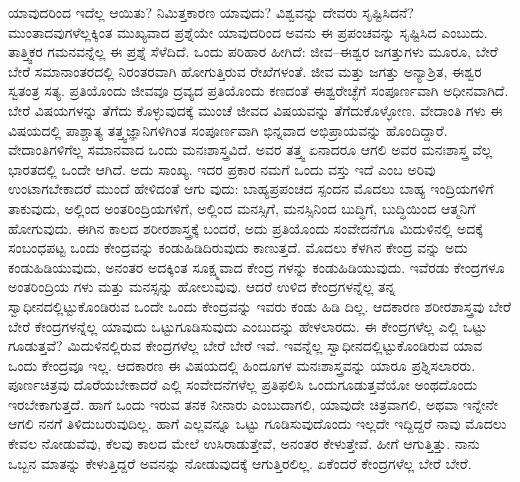 ಯಾವುದರಿಂದ ಇದೆಲ್ಲ ಆಯಿತು? ನಿಮಿತ್ತಕಾರಣ ಯಾವುದು? ವಿಶ್ವವನ್ನು ದೇವರು ಸೃಷ್ಟಿಸಿದನೆ? ಮುಂತಾದವುಗಳೆಲ್ಲಕ್ಕಿಂತ ಮುಖ್ಯವಾದ ಪ್ರಶ್ನೆಯೇ ಯಾವುದರಿಂದ ಅವನು ಈ ಪ್ರಪಂಚವನ್ನು ಸೃಷ್ಟಿಸಿದ ಎಂಬುದು. ತಾತ್ತ್ವಿಕರ ಗಮನವನ್ನೆಲ್ಲ ಈ ಪ್ರಶ್ನೆ ಸೆಳೆದಿದೆ. ಒಂದು ಪರಿಹಾರ ಹೀಗಿದೆ: ಜೀವ–ಈಶ್ವರ ಜಗತ್ತುಗಳು ಮೂರೂ, ಬೇರೆ ಬೇರೆ ಸಮಾನಾಂತರದಲ್ಲಿ ನಿರಂತರವಾಗಿ ಹೋಗುತ್ತಿರುವ ರೇಖೆಗಳಂತೆ. ಜೀವ ಮತ್ತು ಜಗತ್ತು ಅನ್ಯಾಶ್ರಿತ, ಈಶ್ವರ ಸ್ವತಂತ್ರ ಸತ್ಯ. ಪ್ರತಿಯೊಂದು ಜೀವವೂ ದ್ರವ್ಯದ ಪ್ರತಿಯೊಂದು ಕಣದಂತೆ ಈಶ್ವರೇಚ್ಛೆಗೆ ಸಂಪೂರ್ಣವಾಗಿ ಅಧೀನವಾಗಿದೆ. ಬೇರೆ ವಿಷಯಗಳನ್ನು ತೆಗೆದು ಕೊಳ್ಳುವುದಕ್ಕೆ ಮುಂಚೆ ಜೀವದ ವಿಷಯವನ್ನು ತೆಗೆದುಕೊಳ್ಳೋಣ. ವೇದಾಂತಿ ಗಳು ಈ ವಿಷಯದಲ್ಲಿ ಪಾಶ್ಚಾತ್ಯ ತತ್ತ್ವಜ್ಞಾನಿಗಳಿಗಿಂತ ಸಂಪೂರ್ಣವಾಗಿ ಭಿನ್ನವಾದ ಅಭಿಪ್ರಾಯವನ್ನು ಹೊಂದಿದ್ದಾರೆ. ವೇದಾಂತಿಗಳಿಗೆಲ್ಲ ಸಮಾನವಾದ ಒಂದು ಮನಃಶಾಸ್ತ್ರವಿದೆ. ಅವರ ತತ್ತ್ವ ಏನಾದರೂ ಆಗಲಿ ಅವರ ಮನಃಶಾಸ್ತ್ರ ವೆಲ್ಲ ಭಾರತದಲ್ಲಿ ಒಂದೇ ಆಗಿದೆ. ಅದು ಸಾಂಖ್ಯ. ಇದರ ಪ್ರಕಾರ ನಮಗೆ ಒಂದು ವಸ್ತು ಇದೆ ಎಂಬ ಅರಿವು ಉಂಟಾಗಬೇಕಾದರೆ ಮುಂದೆ ಹೇಳಿದಂತೆ ಆಗು ವುದು: ಬಾಹ್ಯಪ್ರಪಂಚದ ಸ್ಪಂದನ ಮೊದಲು ಬಾಹ್ಯ ಇಂದ್ರಿಯಗಳಿಗೆ ತಾಕುವುದು, ಅಲ್ಲಿಂದ ಅಂತರಿಂದ್ರಿಯಗಳಿಗೆ, ಅಲ್ಲಿಂದ ಮನಸ್ಸಿಗೆ, ಮನಸ್ಸಿನಿಂದ ಬುದ್ಧಿಗೆ, ಬುದ್ಧಿಯಿಂದ ಆತ್ಮನಿಗೆ ಹೋಗುವುದು. ಈಗಿನ ಕಾಲದ ಶರೀರಶಾಸ್ತ್ರಕ್ಕೆ ಬಂದರೆ, ಅದು ಪ್ರತಿಯೊಂದು ಸಂವೇದನೆಗೂ ಮಿದುಳಿನಲ್ಲಿ ಅದಕ್ಕೆ ಸಂಬಂಧಪಟ್ಟ ಒಂದು ಕೇಂದ್ರವನ್ನು ಕಂಡುಹಿಡಿದಿರುವುದು ಕಾಣುತ್ತದೆ. ಮೊದಲು ಕೆಳಗಿನ ಕೇಂದ್ರ ವನ್ನು ಅದು ಕಂಡುಹಿಡಿಯುವುದು, ಅನಂತರ ಅದಕ್ಕಿಂತ ಸೂಕ್ಷ್ಮವಾದ ಕೇಂದ್ರ ಗಳನ್ನು ಕಂಡುಹಿಡಿಯುವುದು. ಇವೆರಡು ಕೇಂದ್ರಗಳೂ ಅಂತರಿಂದ್ರಿಯ ಗಳು ಮತ್ತು ಮನಸ್ಸನ್ನು ಹೋಲುವುವು. ಆದರೆ ಉಳಿದ ಕೇಂದ್ರಗಳನ್ನೆಲ್ಲ ತನ್ನ ಸ್ವಾಧೀನದಲ್ಲಿಟ್ಟುಕೊಂಡಿರುವ ಒಂದೇ ಒಂದು ಕೇಂದ್ರವನ್ನು ಇವರು ಕಂಡು ಹಿಡಿ ದಿಲ್ಲ. ಆದಕಾರಣ ಶರೀರಶಾಸ್ತ್ರವು ಬೇರೆ ಬೇರೆ ಕೇಂದ್ರಗಳನ್ನೆಲ್ಲ ಯಾವುದು ಒಟ್ಟುಗೂಡಿಸುವುದು ಎಂಬುದನ್ನು ಹೇಳಲಾರದು. ಈ ಕೇಂದ್ರಗಳೆಲ್ಲ ಎಲ್ಲಿ ಒಟ್ಟು ಗೂಡುತ್ತವೆ? ಮಿದುಳಿನಲ್ಲಿರುವ ಕೇಂದ್ರಗಳೆಲ್ಲ ಬೇರೆ ಬೇರೆ ಇವೆ. ಇವನ್ನೆಲ್ಲ ಸ್ವಾಧೀನದಲ್ಲಿಟ್ಟುಕೊಂಡಿರುವ ಯಾವ ಒಂದು ಕೇಂದ್ರವೂ ಇಲ್ಲ. ಆದಕಾರಣ ಈ ವಿಷಯದಲ್ಲಿ ಹಿಂದೂಗಳ ಮನಃಶಾಸ್ತ್ರವನ್ನು ಯಾರೂ ಪ್ರಶ್ನಿಸಲಾರರು. ಪೂರ್ಣಚಿತ್ರವು ದೊರೆಯಬೇಕಾದರೆ ಎಲ್ಲಿ ಸಂವೇದನೆಗಳೆಲ್ಲ ಪ್ರತಿಫಲಿಸಿ ಒಂದುಗೂಡುತ್ತವೆಯೋ ಅಂಥದೊಂದು ಇರಬೇಕಾಗುತ್ತದೆ. ಹಾಗೆ ಒಂದು ಇರುವ ತನಕ ನೀನಾರು ಎಂಬುದಾಗಲಿ, ಯಾವುದೇ ಚಿತ್ರವಾಗಲಿ, ಅಥವಾ ಇನ್ನೇನೇ ಆಗಲಿ ನನಗೆ ತಿಳಿದುಬರುವುದಿಲ್ಲ. ಹಾಗೆ ಎಲ್ಲವನ್ನೂ ಒಟ್ಟು ಗೂಡಿಸುವುದೊಂದು ಇಲ್ಲದೇ ಇದ್ದಿದ್ದರೆ ನಾವು ಮೊದಲು ಕೇವಲ ನೋಡುವೆವು, ಕೆಲವು ಕಾಲದ ಮೇಲೆ ಉಸಿರಾಡುತ್ತೇವೆ, ಅನಂತರ ಕೇಳುತ್ತೇವೆ. ಹೀಗೆ ಆಗುತ್ತಿತ್ತು. ನಾನು ಒಬ್ಬನ ಮಾತನ್ನು ಕೇಳುತ್ತಿದ್ದರೆ ಅವನನ್ನು ನೋಡುವುದಕ್ಕೆ ಆಗುತ್ತಿರಲಿಲ್ಲ. ಏಕೆಂದರೆ ಕೇಂದ್ರಗಳೆಲ್ಲ ಬೇರೆ ಬೇರೆ.

